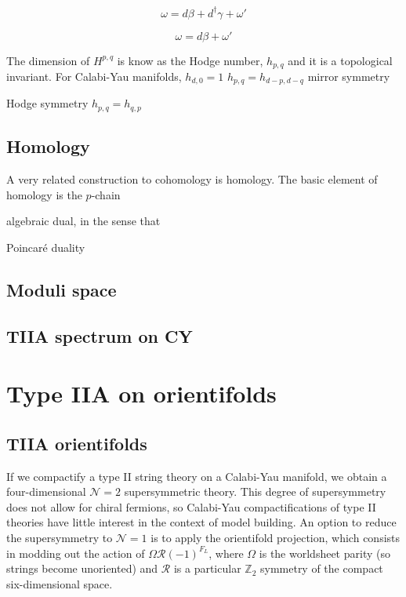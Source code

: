 \begin{equation}
  \omega = d\beta + d^\dagger \gamma +\omega'
\end{equation}

\begin{equation}
  \omega = d\beta + \omega'
\end{equation}

The dimension of $H^{p,q}$ is know as the Hodge number, $h_{p,q}$ and it is a topological invariant.
For Calabi-Yau manifolds, $h_{d,0}=1$
$h_{p,q}=h_{d-p,d-q}$ mirror symmetry

Hodge symmetry $h_{p,q}=h_{q,p}$

\subsection{Homology}

A very related construction to cohomology is homology.
The basic element of homology is the $p$-chain

algebraic dual, in the sense that


Poincaré duality 


\subsection{Moduli space}
%
%
%
%


\subsection{TIIA spectrum on CY}

\section{Type IIA on orientifolds}

\subsection{TIIA orientifolds}
If we compactify a type II string theory on a Calabi-Yau manifold, we  obtain a four-dimensional
$\mathcal N=2$ supersymmetric theory.
This degree of supersymmetry does not allow for chiral fermions, so Calabi-Yau compactifications
of type II theories have little interest in the context of model building.
An option to reduce the supersymmetry to $\mathcal N=1$  is to apply the orientifold
projection, which consists in modding out the action of $\Omega \mathcal R (-1)^{F_L}$, 
where $\Omega$ is the worldsheet parity (so strings become unoriented) and $\mathcal R$ is a particular $\mathbb Z_2$ symmetry of
the compact six-dimensional space.

